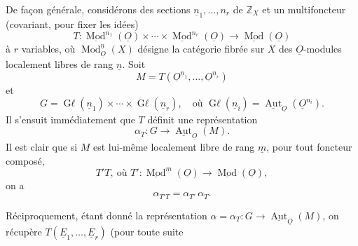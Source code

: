 \documentclass{article}
\newcommand{\Mod}{\operatorname{Mod}}
\newcommand{\Aut}{\operatorname{Aut}}
\begin{document}
De façon générale, considérons des sections \(\underline{n}_1,\ldots,n_r\) de \(\mathbb Z_X\) et un multifoncteur (covariant, pour fixer les idées)
\[
 T:\underline{\Mod}^{n_1}(\underline{O})\times\cdots\times
 \underline{\Mod}^{n_r}(\underline{O})\longrightarrow\underline{\Mod}(\underline{O})
\]
à \(r\) variables, où \(\Mod_{\underline{O}}^{\underline{n}}(X)\) désigne la catégorie fibrée sur \(X\) des \(\underline{O}\)-modules localement libres de rang \(\underline{n}\). Soit
\[
 M=T(\underline{O}^{\underline{n}_1},\ldots,\underline{O}^{\underline{n}_r})
\]
et
\[
 G=\operatorname{G\ell}(\underline{n}_1)\times\cdots\times\operatorname{G\ell}(\underline{n}_r),
 \quad\text{où }\operatorname{G\ell}(\underline{n}_i)=\underline{\Aut}_{\underline{O}}(\underline{O}^{n_i}).
\]
Il s'ensuit immédiatement que \(T\) définit une représentation
\begin{equation}\tag{6.1.2}
 \alpha_T:G\longrightarrow\underline{\Aut}_{\underline{O}}(M).
\end{equation}
Il est clair que si \(M\) est lui-même localement libre de rang \(\underline{m}\), pour tout foncteur composé,
\[
 T'T,\ \text{où } T':\underline{\Mod}^{\underline{m}}(\underline{O})\longrightarrow\underline{\Mod}(\underline{O}),
\]
on a
\begin{equation}\tag{6.1.3}
 \alpha_{T'T}=\alpha_{T'}\,\alpha_T.
\end{equation}

Réciproquement, étant donné la représentation \(\alpha=\alpha_T:G\to\underline{\Aut}_{\underline{O}}(M)\), on récupère \(T(\underline{E}_1,\ldots,\underline{E}_r)\) (pour toute suite
\end{document}
